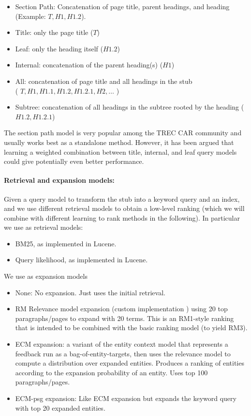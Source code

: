 \documentclass{article}
\begin{document}
\begin{itemize}
    \item Section Path: Concatenation of page title, parent headings, and heading (Example: $T, H1, H1.2$).
    \item Title: only the page title ($T$)
    \item Leaf: only the heading itself ($H1.2$)
    \item Internal: concatenation of the parent heading(s) ($H1$)
    \item All: concatenation of page title and all headings in the stub \\ ( $T, H1, H1.1, H1.2, H1.2.1, H2, \dots$ )
    \item Subtree: concatenation of all headings in the subtree rooted by the heading ($H1.2, H1.2.1$)
\end{itemize}

The section path model is very popular among the TREC CAR community and usually works best as a standalone method. However, it has been argued that learning a weighted combination between title, internal, and leaf query models could give potentially even better performance.


\paragraph{Retrieval and expansion models:}

Given a query model to transform the stub into a keyword query and an index, and we  use different retrieval models to obtain a low-level ranking (which we will combine with different learning to rank methods in the following). In particular we use as retrieval models:

\begin{itemize}
    \item BM25, as implemented in Lucene.
    \item Query likelihood, as implemented in Lucene.
\end{itemize}

We use as expansion models    
\begin{itemize}
    \item None: No expansion. Just uses the initial retrieval.
    \item RM Relevance model expansion (custom implementation \cite{lavrenko2017relevance}) using 20 top paragraphs/pages to expand with 20 terms. This is an RM1-style ranking that is intended to be combined with the basic ranking model (to yield RM3).
    \item ECM expansion: a variant of the entity context model \cite{dalton2014entity} that represents a feedback run as a bag-of-entity-targets, then uses the relevance model to compute a distribution over expanded entities. Produces a ranking of entities according to the expansion probability of an entity. Uses top 100 paragraphs/pages.
    \item ECM-psg expansion: Like ECM expansion but expands the keyword query with top 20 expanded entities.
\end{itemize}
\end{document}
